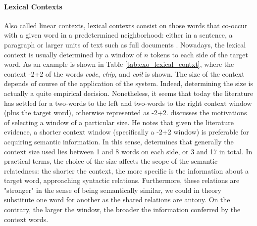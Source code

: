 

\paragraph{Lexical Contexts}
Also called linear contexts, lexical contexts consist on those  words that co-occur with a given word in a predetermined neighborhood: either in a sentence, a paragraph or larger units of text such as full documents \cite{LevyG14,sahlgren2008distributional}. Nowadays, the lexical context is usually determined by a window of $n$ tokens to each side of the target word. As an example is shown in Table \ref{tab:exo_lexical_contxt}, where the context -2+2 of the words \textit{code}, \textit{chip}, and \textit{coil} is shown. The size of the context depends of course of the application of the system. Indeed, determining the size  is actually a quite empirical decision. Nonetheless, it seems that today the literature \cite{Daume2006,mikolov2013distributed,LevyG14,levy2014neural}  has settled for a two-words to the left and two-words to the right context window (plus the target word), otherwise represented as -2+2. \cite{sahlgren2006word} discusses  the motivations of selecting a window of a particular size. He notes that given the literature evidence,  a shorter context window (specifically a -2+2 window) is preferable for acquiring semantic information. In this sense, \cite{JurafskyM09} determines that generally the context size used lies between 1 and 8 words on each side, or 3 and 17 in total. In practical terms, the choice of the size  affects the scope of the semantic relatedness: the shorter the context, the more specific is the information about a target word, approaching syntactic relations. Furthermore, these relations are "stronger" in the sense of being semantically similar, we could in theory substitute one word for another as the shared relations are antony. On the contrary, the larger the window, the broader the information conferred by the context words. 



